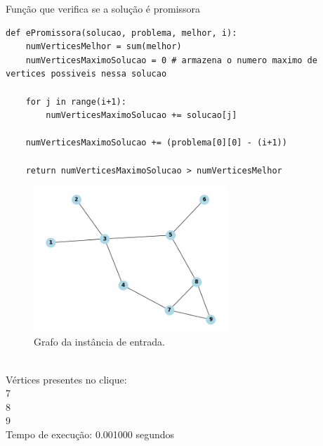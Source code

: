 \documentclass[compress,aspectratio=169]{beamer}
\begin{document}
    \begin{frame}[fragile]{Função que verifica se a solução é promissora}
        \begin{lstlisting}
def ePromissora(solucao, problema, melhor, i):
    numVerticesMelhor = sum(melhor)
    numVerticesMaximoSolucao = 0 # armazena o numero maximo de vertices possiveis nessa solucao
    
    for j in range(i+1):
        numVerticesMaximoSolucao += solucao[j]

    numVerticesMaximoSolucao += (problema[0][0] - (i+1))
    
    return numVerticesMaximoSolucao > numVerticesMelhor
        \end{lstlisting}
    \end{frame}

    \begin{frame}
        \begin{figure}[H]
            \centering
            \includegraphics[width=0.65\textwidth]{images/grafo_instancia1.png}
            \caption{Grafo da instância de entrada.}
            \label{fig:instancia1Clique}
        \end{figure}
    \end{frame} 

    \begin{frame}
        \begin{tcolorbox}[title=Saída da instância de entrada, width=\linewidth, 
          fontupper=\ttfamily, 
          halign=flush left]
            [0, 0, 0, 0, 0, 0, 1, 1, 1] \\
            Vértices presentes no clique: \\
            7 \\
            8 \\
            9 \\
            Tempo de execução: 0.001000 segundos \\
        \end{tcolorbox}
    \end{frame}
\end{document}
